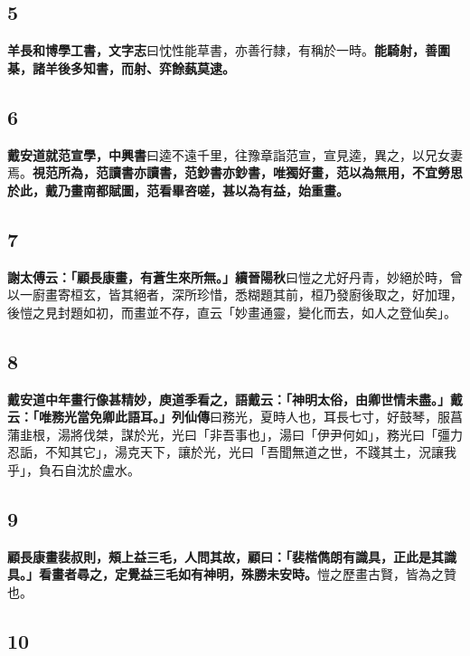 \subsection*{5}

\textbf{羊長和博學工書，}{\footnotesize \textbf{文字志}曰忱性能草書，亦善行隸，有稱於一時。}\textbf{能騎射，善圍棊，諸羊後多知書，而射、弈餘蓺莫逮。}

\subsection*{6}

\textbf{戴安道就范宣學，}{\footnotesize \textbf{中興書}曰逵不遠千里，往豫章詣范宣，宣見逵，異之，以兄女妻焉。}\textbf{視范所為，范讀書亦讀書，范鈔書亦鈔書，唯獨好畫，范以為無用，不宜勞思於此，戴乃畫南都賦圖，范看畢咨嗟，甚以為有益，始重畫。}

\subsection*{7}

\textbf{謝太傅云：「顧長康畫，有蒼生來所無。」}{\footnotesize \textbf{續晉陽秋}曰愷之尤好丹青，妙絕於時，曾以一廚畫寄桓玄，皆其絕者，深所珍惜，悉糊題其前，桓乃發廚後取之，好加理，後愷之見封題如初，而畫並不存，直云「妙畫通靈，變化而去，如人之登仙矣」。}

\subsection*{8}

\textbf{戴安道中年畫行像甚精妙，庾道季看之，語戴云：「神明太俗，由卿世情未盡。」戴云：「唯務光當免卿此語耳。」}{\footnotesize \textbf{列仙傳}曰務光，夏時人也，耳長七寸，好鼓琴，服菖蒲韭根，湯將伐桀，謀於光，光曰「非吾事也」，湯曰「伊尹何如」，務光曰「彊力忍詬，不知其它」，湯克天下，讓於光，光曰「吾聞無道之世，不踐其土，況讓我乎」，負石自沈於盧水。}

\subsection*{9}

\textbf{顧長康畫裴叔則，頰上益三毛，人問其故，顧曰：「裴楷儁朗有識具，正此是其識具。」看畫者尋之，定覺益三毛如有神明，殊勝未安時。}{\footnotesize 愷之歷畫古賢，皆為之贊也。}

\subsection*{10}


